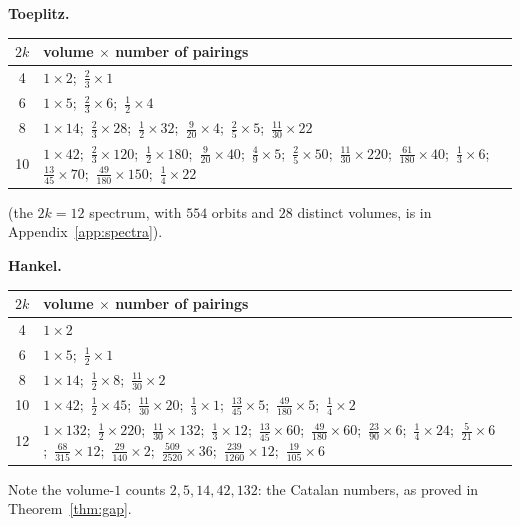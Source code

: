 ﻿\documentclass[11pt]{article}
\theoremstyle{remark}
\begin{document}
\medskip
\noindent\textbf{Toeplitz.}
\begin{center}
\small
\begin{tabular}{c|p{}}
\toprule
$2k$ & volume $\times$ number of pairings\\
\midrule
4 & $1\times2$;\ $\tfrac23\times1$\\
6 & $1\times5$;\ $\tfrac23\times6$;\ $\tfrac12\times4$\\
8 & $1\times14$;\ $\tfrac23\times28$;\ $\tfrac12\times32$;\ $\tfrac9{20}\times4$;\
$\tfrac25\times5$;\ $\tfrac{11}{30}\times22$\\
10 & $1\times42$;\ $\tfrac23\times120$;\ $\tfrac12\times180$;\ $\tfrac9{20}\times40$;\
$\tfrac49\times5$;\ $\tfrac25\times50$;\ $\tfrac{11}{30}\times220$;\
$\tfrac{61}{180}\times40$;\ $\tfrac13\times6$;\ $\tfrac{13}{45}\times70$;\
$\tfrac{49}{180}\times150$;\ $\tfrac14\times22$\\
\bottomrule
\end{tabular}
\end{center}
(the $2k=12$ spectrum, with $554$ orbits and $28$ distinct volumes, is in
Appendix~\ref{app:spectra}).

\medskip
\noindent\textbf{Hankel.}
\begin{center}
\small
\begin{tabular}{c|p{}}
\toprule
$2k$ & volume $\times$ number of pairings\\
\midrule
4 & $1\times2$\\
6 & $1\times5$;\ $\tfrac12\times1$\\
8 & $1\times14$;\ $\tfrac12\times8$;\ $\tfrac{11}{30}\times2$\\
10 & $1\times42$;\ $\tfrac12\times45$;\ $\tfrac{11}{30}\times20$;\ $\tfrac13\times1$;\
$\tfrac{13}{45}\times5$;\ $\tfrac{49}{180}\times5$;\ $\tfrac14\times2$\\
12 & $1\times132$;\ $\tfrac12\times220$;\ $\tfrac{11}{30}\times132$;\ $\tfrac13\times12$;\
$\tfrac{13}{45}\times60$;\ $\tfrac{49}{180}\times60$;\ $\tfrac{23}{90}\times6$;\
$\tfrac14\times24$;\ $\tfrac5{21}\times6$;\ $\tfrac{68}{315}\times12$;\
$\tfrac{29}{140}\times2$;\ $\tfrac{509}{2520}\times36$;\ $\tfrac{239}{1260}\times12$;\
$\tfrac{19}{105}\times6$\\
\bottomrule
\end{tabular}
\end{center}

Note the volume-$1$ counts $2,5,14,42,132$: the Catalan numbers, as proved in
Theorem~\ref{thm:gap}.
\end{document}
